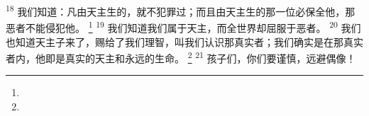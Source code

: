 \begin{multicols}{2}
\textsuperscript{18}
我们知道：凡由天主生的，就不犯罪过；而且由天主生的那一位必保全他，那恶者不能侵犯他。
\footnote{}
\textsuperscript{19}
我们知道我们属于天主，而全世界却屈服于恶者。
\textsuperscript{20}
我们也知道天主子来了，赐给了我们理智，叫我们认识那真实者；我们确实是在那真实者内，他即是真实的天主和永远的生命。
\footnote{}
\textsuperscript{21}
孩子们，你们要谨慎，远避偶像！

\end{multicols}